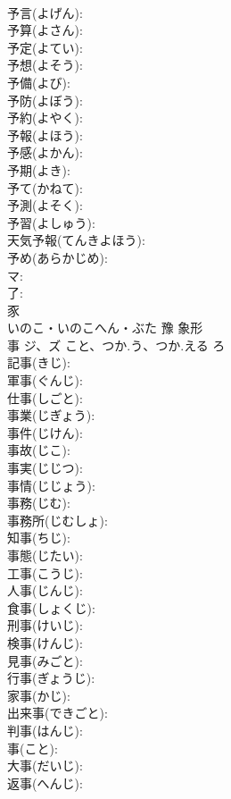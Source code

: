\documentclass[8pt]{extreport}
\begin{document}
\begin{CJK}{UTF8}{min}
\\	予言(よげん): 
\\	予算(よさん): 
\\	予定(よてい): 
\\	予想(よそう): 
\\	予備(よび): 
\\	予防(よぼう): 
\\	予約(よやく): 
\\	予報(よほう): 
\\	予感(よかん): 
\\	予期(よき): 
\\	予て(かねて): 
\\	予測(よそく): 
\\	予習(よしゅう): 
\\	天気予報(てんきよほう): 
\\	予め(あらかじめ): 
\\	マ: 
\\	了: 
\\	豕	
\\	いのこ・いのこへん・ぶた	豫	象形 
\\	事	ジ、ズ	こと、つか.う、つか.える	ろ	
\\	記事(きじ): 
\\	軍事(ぐんじ): 
\\	仕事(しごと): 
\\	事業(じぎょう): 
\\	事件(じけん): 
\\	事故(じこ): 
\\	事実(じじつ): 
\\	事情(じじょう): 
\\	事務(じむ): 
\\	事務所(じむしょ): 
\\	知事(ちじ): 
\\	事態(じたい): 
\\	工事(こうじ): 
\\	人事(じんじ): 
\\	食事(しょくじ): 
\\	刑事(けいじ): 
\\	検事(けんじ): 
\\	見事(みごと): 
\\	行事(ぎょうじ): 
\\	家事(かじ): 
\\	出来事(できごと): 
\\	判事(はんじ): 
\\	事(こと): 
\\	大事(だいじ): 
\\	返事(へんじ): 

\end{CJK}
\end{document}

